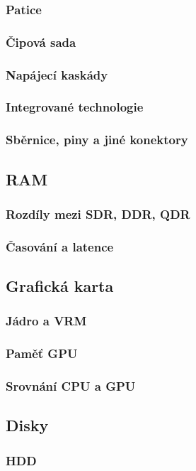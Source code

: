 \documentclass[a4paper]{article}
\begin{document}
        \subsubsection{Patice}
        \subsubsection{Čipová sada}
        \subsubsection{Napájecí kaskády}
        \subsubsection{Integrované technologie}
        \subsubsection{Sběrnice, piny a jiné konektory}
    \subsection{RAM}
        \subsubsection{Rozdíly mezi SDR, DDR, QDR}
        \subsubsection{Časování a latence}
    \subsection{Grafická karta}
        \subsubsection{Jádro a VRM}
        \subsubsection{Paměť GPU}
        \subsubsection{Srovnání CPU a GPU}
    \subsection{Disky}
        \subsubsection{HDD}
\end{document}

